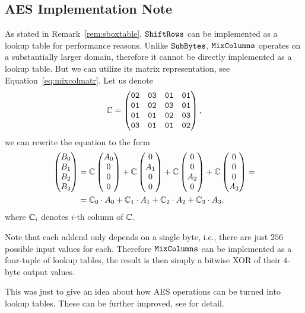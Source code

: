 \subsection{AES Implementation Note}
\label{sec:aeslookup}

As stated in Remark~\ref{rem:sboxtable}, $\texttt{ShiftRows}$ can be implemented as a lookup table for performance reasons. Unlike $\texttt{SubBytes}$, $\texttt{MixColumns}$ operates on a substantially larger domain, therefore it cannot be directly implemented as a lookup table. But we can utilize its matrix representation, see Equation~\ref{eq:mixcolmatr}. Let us denote
\[
	\mathbb{C} =
	\begin{pmatrix}
		\texttt{02} & \texttt{03} & \texttt{01} & \texttt{01} \\
		\texttt{01} & \texttt{02} & \texttt{03} & \texttt{01} \\
		\texttt{01} & \texttt{01} & \texttt{02} & \texttt{03} \\
		\texttt{03} & \texttt{01} & \texttt{01} & \texttt{02}
	\end{pmatrix} ,
\]
we can rewrite the equation to the form
\begin{align*}
	\begin{pmatrix}
			B_0 \\ B_1 \\ B_2 \\ B_3
		\end{pmatrix}
		&=
		\mathbb{C}
		\begin{pmatrix}
			A_0 \\ 0 \\ 0 \\ 0
		\end{pmatrix}
		+
		\mathbb{C}
		\begin{pmatrix}
			0 \\ A_1 \\ 0 \\ 0
		\end{pmatrix}
		+
		\mathbb{C}
		\begin{pmatrix}
			0 \\ 0 \\ A_2 \\ 0
		\end{pmatrix}
		+
		\mathbb{C}
		\begin{pmatrix}
			0 \\ 0 \\ 0 \\ A_3
		\end{pmatrix}
		= \\
		&=
		\mathbb{C}_0 \cdot A_0   
		 +
		\mathbb{C}_1 \cdot A_1  
		 +
		\mathbb{C}_2 \cdot A_2 
		 +
		\mathbb{C}_3 \cdot A_3 ,
\end{align*}
where $\mathbb{C}_i$ denotes $i$-th column of $\mathbb{C}$.

Note that each addend only depends on a single byte, i.e., there are just $256$ possible input values for each. Therefore $\texttt{MixColumns}$ can be implemented as a four-tuple of lookup tables, the result is then simply a bitwise XOR of their $4$-byte output values.

This was just to give an idea about how AES operations can be turned into lookup tables. These can be further improved, see \cite[Chapter~4]{daemen2013rijndael} for detail.
